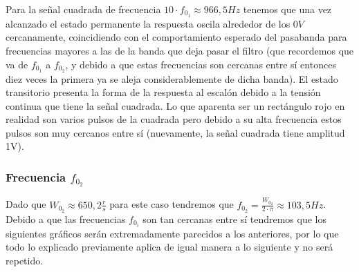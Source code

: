 \documentclass[11pt,a4paper]{report}
\begin{document}
Para la señal cuadrada de frecuencia $10 \cdot f_{0_{1}} \approx 966,5Hz$ tenemos que una vez alcanzado el estado permanente la respuesta oscila alrededor de los $0V$ cercanamente, coincidiendo con el comportamiento esperado del pasabanda para frecuencias mayores a las de la banda que deja pasar el filtro (que recordemos que va de $f_{0_{1}}$ a $f_{0_{2}}$, y debido a que estas frecuencias son cercanas entre sí entonces diez veces la primera ya se aleja considerablemente de dicha banda). El estado transitorio presenta la forma de la respuesta al escalón debido a la tensión continua que tiene la señal cuadrada. Lo que aparenta ser un rectángulo rojo en realidad son varios pulsos de la cuadrada pero debido a su alta frecuencia estos pulsos son muy cercanos entre sí (nuevamente, la señal cuadrada tiene amplitud 1V).

\subsubsection*{Frecuencia $f_{0_{2}}$}

Dado que $W_{0_{2}} \approx 650,2\frac{r}{s}$ para este caso tendremos que $f_{0_{2}} = \frac{W_{0_{2}}}{2 \cdot \pi} \approx 103,5Hz$. Debido a que las frecuencias $f_{0_{i}}$ son tan cercanas entre sí tendremos que los siguientes gráficos serán extremadamente parecidos a los anteriores, por lo que todo lo explicado previamente aplica de igual manera a lo siguiente y no será repetido.
\end{document}
